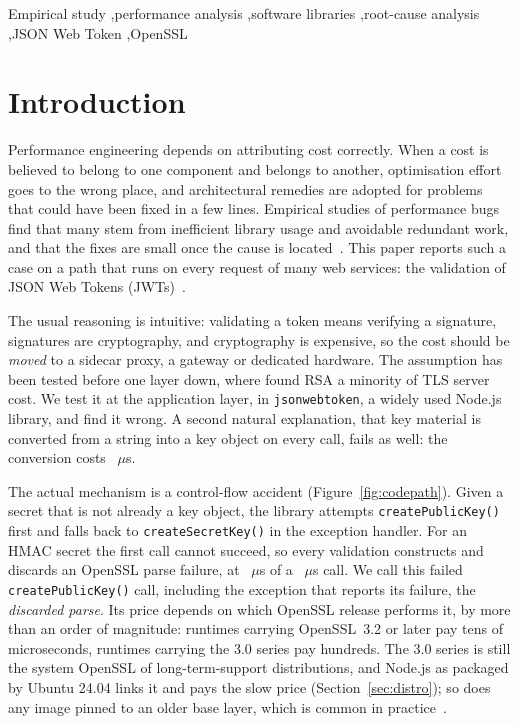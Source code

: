 \documentclass[preprint,12pt,authoryear]{elsarticle}
\newcommand{\LibraryName}{\texttt{jsonwebtoken}}
\begin{document}
\begin{frontmatter}
\begin{keyword}
Empirical study \sep performance analysis \sep software libraries
\sep root-cause analysis \sep JSON Web Token \sep OpenSSL
\end{keyword}

\end{frontmatter}

\linenumbers

\section{Introduction}\label{sec:intro}

Performance engineering depends on attributing cost correctly. When a cost is
believed to belong to one component and belongs to another, optimisation
effort goes to the wrong place, and architectural remedies are adopted for
problems that could have been fixed in a few lines. Empirical studies of
performance bugs find that many stem from inefficient library usage and
avoidable redundant work, and that the fixes are small once the cause is
located~\citep{jin2012understanding,selakovic2016performance}. This paper
reports such a case on a path that runs on every request of many web
services: the validation of JSON Web Tokens (JWTs)~\citep{rfc7519}.

The usual reasoning is intuitive: validating a token means verifying a
signature, signatures are cryptography, and cryptography is expensive, so the
cost should be \emph{moved} to a sidecar proxy, a gateway or dedicated
hardware. The assumption has been tested before one layer down, where
\citet{coarfa2006performance} found RSA a minority of TLS server cost. We test
it at the application layer, in \LibraryName{}, a widely used Node.js library,
and find it wrong. A second natural explanation, that key material is
converted from a string into a key object on every call, fails as well: the
conversion costs \HostCreateSecretKey~$\mu$s.

The actual mechanism is a control-flow accident (Figure~\ref{fig:codepath}).
Given a secret that is not already a key object, the library attempts
\texttt{createPublicKey()} first and falls back to \texttt{createSecretKey()}
in the exception handler. For an HMAC secret the first call cannot succeed, so
every validation constructs and discards an OpenSSL parse failure, at
\HostProbeThrows~$\mu$s of a \HostJwtString~$\mu$s call. We call this failed
\texttt{createPublicKey()} call, including the exception that reports its
failure, the \emph{discarded parse}. Its price depends on
which OpenSSL release performs it, by more than an order of magnitude:
runtimes carrying OpenSSL~3.2 or later pay tens of microseconds, runtimes
carrying the 3.0 series pay hundreds. The 3.0 series is still the system
OpenSSL of long-term-support distributions, and Node.js as packaged by Ubuntu
24.04 links it and pays the slow price (Section~\ref{sec:distro}); so does any
image pinned to an older base layer, which is common in
practice~\citep{zerouali2019outdated}.
\end{document}
